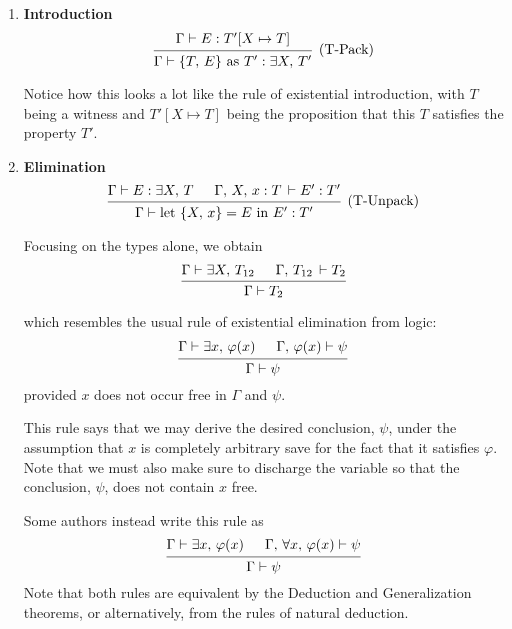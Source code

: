 \documentclass{article}
\begin{document}
\begin{enumerate}
  \item \textbf{Introduction} \\
  \[
  \begin{prooftree}
    \hypo{\Gamma \vdash E : T'[X \mapsto T]}
    \infer1[(T-Pack)]{\Gamma \vdash \{T, \, E\} \text{ as } T' : \exists X, \, T'}
  \end{prooftree}
  \]

  Notice how this looks a lot like the rule of existential introduction, with $T$
  being a witness and $T'[X \mapsto T]$ being the proposition that this $T$
  satisfies the property $T'$. 
 
  \item \textbf{Elimination} \\
  \[
   \begin{prooftree}
     \hypo{\Gamma \vdash E : \exists X, \, T } 
     \hypo{\Gamma, \, X, \, x : T \, \vdash E' : T'}
     \infer2[(T-Unpack)]{\Gamma \vdash \text{let } \{X, \, x\} = E \text{ in } E' : T'}
   \end{prooftree}
  \]

  Focusing on the types alone, we obtain
  \[
    \begin{prooftree}
      \hypo{\Gamma \vdash \exists X, \, T_{12} } 
      \hypo{\Gamma, \, T_{12} \, \vdash T_2}
      \infer2{\Gamma \vdash T_2}
    \end{prooftree} 
  \]

  which resembles the usual rule of existential elimination from logic:
  \[
  \begin{prooftree}
    \hypo{\Gamma \vdash \exists x, \, \varphi(x)}
    \hypo{\Gamma, \, \varphi(x) \vdash \psi}
    \infer2{\Gamma \vdash \psi}
  \end{prooftree}
  \]
  provided $x$ does not occur free in $\Gamma$ and $\psi$.

  This rule says that we may derive the desired conclusion, $\psi$, 
  under the assumption that $x$ is completely arbitrary save for the fact that it 
  satisfies $\varphi$. Note that we must also make sure to discharge the variable
  so that the conclusion, $\psi$, does not contain $x$ free. 

  Some authors instead write this rule as
  \[
  \begin{prooftree}
    \hypo{\Gamma \vdash \exists x, \, \varphi(x)}
    \hypo{\Gamma, \, \forall x, \, \varphi(x) \vdash \psi}
    \infer2{\Gamma \vdash \psi}
  \end{prooftree}
  \]
  Note that both rules are equivalent by the Deduction and Generalization
  theorems, or alternatively, from the rules of natural deduction.

\end{enumerate}
\end{document}

